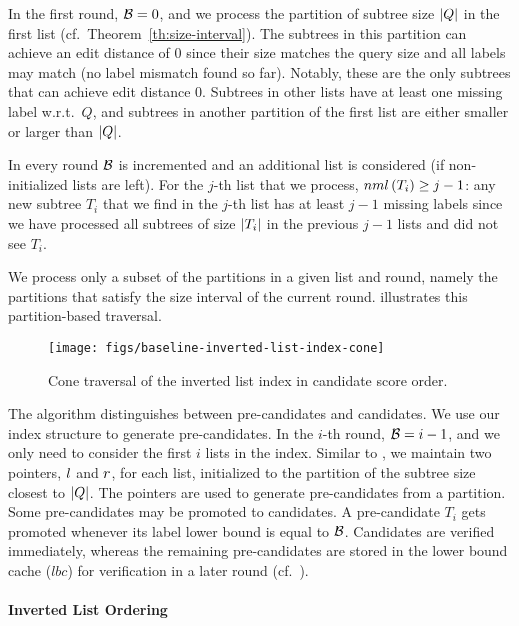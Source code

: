In the first round, $\mathcal{B} = 0$, and we process the partition of subtree size $\left| Q \right|$ in the first list (cf.\ Theorem~\ref{th:size-interval}). The subtrees in this partition can achieve an edit distance of $0$ since their size matches the query size and all labels may match (no label mismatch found so far). Notably, these are the only subtrees that can achieve edit distance $0$. Subtrees in other lists have at least one missing label w.r.t.\ $Q$, and subtrees in another partition of the first list are either smaller or larger than $\left| Q \right|$.

In every round $\mathcal{B}$ is incremented and an additional list is considered (if non-initialized lists are left). For the $j$-th list that we process,  $nml \left( T_i \right) \geq j - 1$: any new subtree $T_i$ that we find in the $j$-th list has at least $j - 1$ missing labels since we have processed all subtrees of size $\left| T_i \right|$ in the previous $j - 1$ lists and did not see $T_i$.

We process only a subset of the partitions in a given list and round, namely the partitions that satisfy the size interval of the current round.  illustrates this partition-based traversal.

\begin{figure}[ht!]
  \centering
  \texttt{[image: figs/baseline-inverted-list-index-cone]}
  \caption{Cone traversal of the inverted list index in candidate score order.}
  \label{fig:baseline-inverted-list-index-cone}
\end{figure}

The \cone{} algorithm distinguishes between pre-candidates and candidates.
We use our index structure to generate pre-candidates. In the $i$-th round, $\mathcal{B}=i-1$, and we only need to consider the first $i$ lists in the index. Similar to \lowerboundmerge{}, we maintain two pointers, $l{}$ and $r{}$, for each list, initialized to the partition of the subtree size closest to $\left| Q \right|$. The pointers are used to generate pre-candidates from a partition. Some pre-candidates may be promoted to candidates. A pre-candidate $T_i$ gets promoted whenever its label lower bound is equal to $\mathcal{B}$. Candidates are verified immediately, whereas the remaining pre-candidates are stored in the lower bound cache ($lbc$) for verification in a later round (cf.\ ).

\paragraph{Inverted List Ordering}

